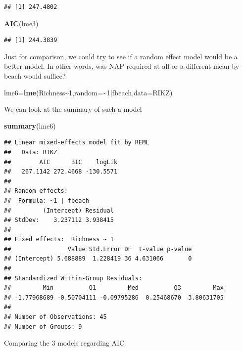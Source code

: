 \documentclass[
]{book}
\newenvironment{Shaded}{\begin{snugshade}}{\end{snugshade}}
\newcommand{\AttributeTok}[1]{\textcolor[rgb]{0.13,0.29,0.53}{#1}}
\newcommand{\DecValTok}[1]{\textcolor[rgb]{0.00,0.00,0.81}{#1}}
\newcommand{\FunctionTok}[1]{\textcolor[rgb]{0.13,0.29,0.53}{\textbf{#1}}}
\newcommand{\NormalTok}[1]{#1}
\newcommand{\OtherTok}[1]{\textcolor[rgb]{0.56,0.35,0.01}{#1}}
\newcommand{\SpecialCharTok}[1]{\textcolor[rgb]{0.81,0.36,0.00}{\textbf{#1}}}
\begin{document}
\begin{verbatim}
## [1] 247.4802
\end{verbatim}

\begin{Shaded}
\begin{Highlighting}[]
\FunctionTok{AIC}\NormalTok{(lme3)}
\end{Highlighting}
\end{Shaded}

\begin{verbatim}
## [1] 244.3839
\end{verbatim}

Just for comparison, we could try to see if a random effect model would be a better model. In other words, was NAP required at all or a different mean by beach would suffice?

\begin{Shaded}
\begin{Highlighting}[]
\NormalTok{lme6}\OtherTok{=}\FunctionTok{lme}\NormalTok{(Richness}\SpecialCharTok{\textasciitilde{}}\DecValTok{1}\NormalTok{,}\AttributeTok{random=}\SpecialCharTok{\textasciitilde{}}\DecValTok{1}\SpecialCharTok{|}\NormalTok{fbeach,}\AttributeTok{data=}\NormalTok{RIKZ)}
\end{Highlighting}
\end{Shaded}

We can look at the summary of such a model

\begin{Shaded}
\begin{Highlighting}[]
\FunctionTok{summary}\NormalTok{(lme6)}
\end{Highlighting}
\end{Shaded}

\begin{verbatim}
## Linear mixed-effects model fit by REML
##   Data: RIKZ 
##        AIC      BIC    logLik
##   267.1142 272.4668 -130.5571
## 
## Random effects:
##  Formula: ~1 | fbeach
##         (Intercept) Residual
## StdDev:    3.237112 3.938415
## 
## Fixed effects:  Richness ~ 1 
##                Value Std.Error DF  t-value p-value
## (Intercept) 5.688889  1.228419 36 4.631066       0
## 
## Standardized Within-Group Residuals:
##         Min          Q1         Med          Q3         Max 
## -1.77968689 -0.50704111 -0.09795286  0.25468670  3.80631705 
## 
## Number of Observations: 45
## Number of Groups: 9
\end{verbatim}

Comparing the 3 models regarding AIC
\end{document}
